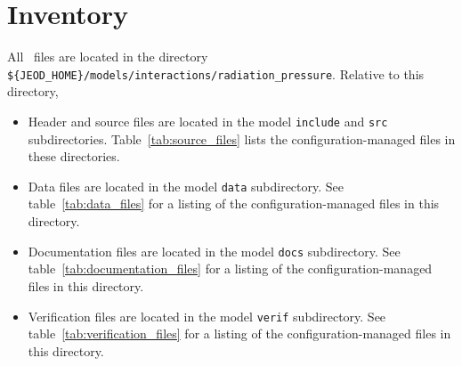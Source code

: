 %
%
%

\section{Inventory}
All \RadiationPressureDesc\ files are located in the directory \newline
{\tt \$\{JEOD\_HOME\}/models/interactions/radiation\_pressure}.
Relative to this directory,
\begin{itemize}
\vspace{-0.2\baselineskip}
\item Header and source files are located
in the model {\tt include} and {\tt src} subdirectories.
Table~\ref{tab:source_files} lists the
configuration-managed files in these directories.
\vspace{-0.1\baselineskip}
\item Data files are located in the model {\tt data} subdirectory.
See table~\ref{tab:data_files}
for a listing of the
configuration-managed files in this directory.
\vspace{-0.1\baselineskip}
\item Documentation files are located in the model {\tt docs} subdirectory.
See table~\ref{tab:documentation_files}
for a listing of the
configuration-managed files in this directory.
\vspace{-0.1\baselineskip}
\item Verification files are located in the model {\tt verif} subdirectory.
See table~\ref{tab:verification_files}
for a listing of the
configuration-managed files in this directory.
\end{itemize}


